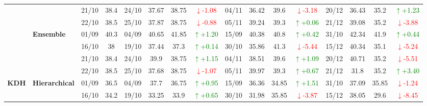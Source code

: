 {\begin{longtable}{llcc|cccc|cccc|cccc}
& 
& 21/10 & 38.4 & 24/10 & 37.67 & 38.75 & \textcolor{red}{\(\downarrow\)-1.08} & 04/11 & 36.42 & 39.6 & \textcolor{red}{\(\downarrow\)-3.18} & 20/12 & 36.43 & 35.2 & \textcolor{green}{\(\uparrow\)+1.23} \\

&
& 22/10 & 38.5 & 25/10 & 37.87 & 38.75 & \textcolor{red}{\(\downarrow\)-0.88} & 05/11 & 39.24 & 39.3 & \textcolor{green}{\(\uparrow\)+0.06} & 21/12 & 39.08 & 35.2 & \textcolor{red}{\(\downarrow\)-3.88} \\
\cmidrule(lr){2-16}


& \textbf{Ensemble}
& 01/09 & 40.3 & 04/09 & 40.65 & 41.85 & \textcolor{green}{\(\uparrow\)+1.20} & 15/09 & 40.38 & 40.8 & \textcolor{green}{\(\uparrow\)+0.42} & 31/10 & 42.34 & 41.9 & \textcolor{green}{\(\uparrow\)+0.44} \\

& 
& 16/10 & 38 & 19/10 & 37.44 & 37.3 & \textcolor{green}{\(\uparrow\)+0.14} & 30/10 & 35.86 & 41.3 & \textcolor{red}{\(\downarrow\)-5.44} & 15/12 & 40.34 & 35.1 & \textcolor{red}{\(\downarrow\)-5.24} \\

& 
& 21/10 & 38.4 & 24/10 & 39.9 & 38.75 & \textcolor{green}{\(\uparrow\)+1.15} & 04/11 & 38.51 & 39.6 & \textcolor{green}{\(\uparrow\)+1.09} & 20/12 & 40.71 & 35.2 & \textcolor{red}{\(\downarrow\)-5.51} \\

&
& 22/10 & 38.5 & 25/10 & 37.68 & 38.75 & \textcolor{red}{\(\downarrow\)-1.07} & 05/11 & 39.97 & 39.3 & \textcolor{green}{\(\uparrow\)+0.67} & 21/12 & 31.8 & 35.2 & \textcolor{green}{\(\uparrow\)+3.40} \\
\midrule



\multirow{12}{*}{\textbf{KDH}} 
& \textbf{Hierarchical}
& 01/09 & 36.5 & 04/09 & 37.7 & 36.75 & \textcolor{green}{\(\uparrow\)+0.95} & 15/09 & 36.36 & 34.85 & \textcolor{green}{\(\uparrow\)+1.51} & 31/10 & 37.09 & 35.85 & \textcolor{red}{\(\downarrow\)-1.24} \\

&
& 16/10 & 34.2 & 19/10 & 33.25 & 33.9 & \textcolor{green}{\(\uparrow\)+0.65} & 30/10 & 31.98 & 35.85 & \textcolor{red}{\(\downarrow\)-3.87} & 15/12 & 38.05 & 29.6 & \textcolor{red}{\(\downarrow\)-8.45} \\


\end{longtable}}
